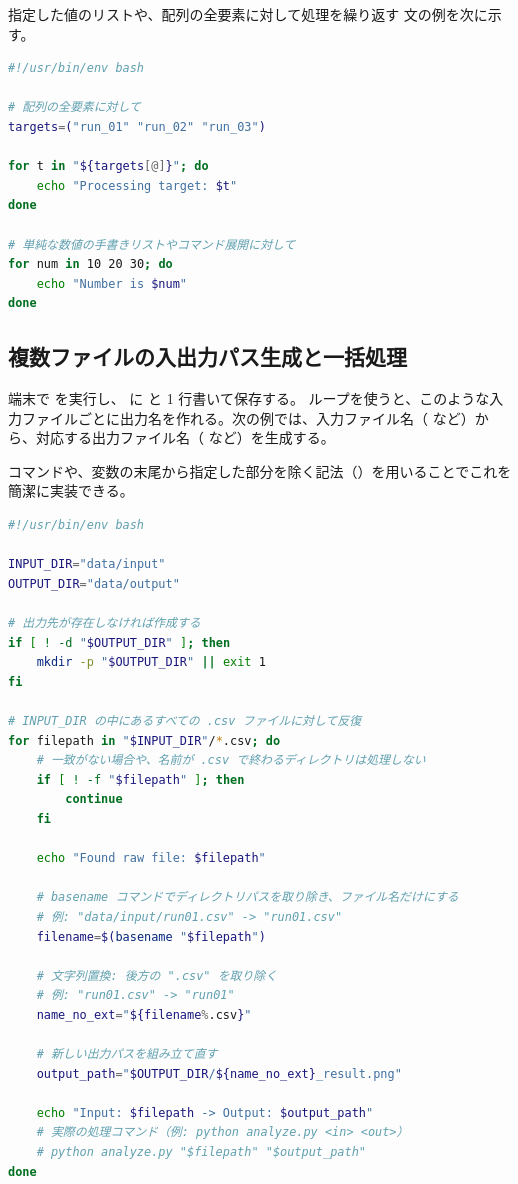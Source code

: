 指定した値のリストや、配列の全要素に対して処理を繰り返す  文の例を次に示す。

\begin{lstlisting}[language=bash]
#!/usr/bin/env bash

# 配列の全要素に対して
targets=("run_01" "run_02" "run_03")

for t in "${targets[@]}"; do
    echo "Processing target: $t"
done

# 単純な数値の手書きリストやコマンド展開に対して
for num in 10 20 30; do
    echo "Number is $num"
done
\end{lstlisting}

\subsection{複数ファイルの入出力パス生成と一括処理}

端末で  を実行し、 に  と 1 行書いて保存する。 ループを使うと、このような入力ファイルごとに出力名を作れる。次の例では、入力ファイル名（ など）から、対応する出力ファイル名（ など）を生成する。

 コマンドや、変数の末尾から指定した部分を除く記法（）を用いることでこれを簡潔に実装できる。

\begin{lstlisting}[language=bash]
#!/usr/bin/env bash

INPUT_DIR="data/input"
OUTPUT_DIR="data/output"

# 出力先が存在しなければ作成する
if [ ! -d "$OUTPUT_DIR" ]; then
    mkdir -p "$OUTPUT_DIR" || exit 1
fi

# INPUT_DIR の中にあるすべての .csv ファイルに対して反復
for filepath in "$INPUT_DIR"/*.csv; do
    # 一致がない場合や、名前が .csv で終わるディレクトリは処理しない
    if [ ! -f "$filepath" ]; then
        continue
    fi

    echo "Found raw file: $filepath"

    # basename コマンドでディレクトリパスを取り除き、ファイル名だけにする
    # 例: "data/input/run01.csv" -> "run01.csv"
    filename=$(basename "$filepath")

    # 文字列置換: 後方の ".csv" を取り除く
    # 例: "run01.csv" -> "run01"
    name_no_ext="${filename%.csv}"

    # 新しい出力パスを組み立て直す
    output_path="$OUTPUT_DIR/${name_no_ext}_result.png"

    echo "Input: $filepath -> Output: $output_path"
    # 実際の処理コマンド（例: python analyze.py <in> <out>）
    # python analyze.py "$filepath" "$output_path"
done
\end{lstlisting}

